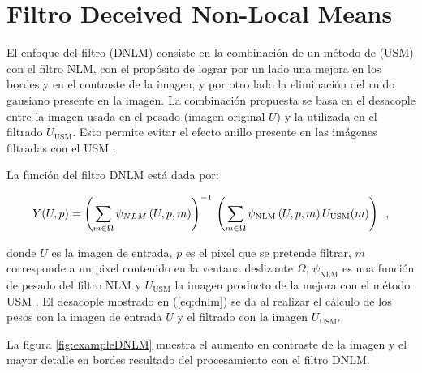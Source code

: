 \section{Filtro Deceived Non-Local Means}
\label{ch:marco_dnlm}


El enfoque del filtro  (DNLM) consiste en la combinación de un método de  (USM) con el filtro NLM, con el propósito de lograr por un lado una mejora en los bordes y en el contraste de la imagen, y por otro lado la eliminación del ruido gausiano  presente en la imagen. La combinación propuesta se basa en el desacople entre la imagen usada en el pesado (imagen original $U$) y la utilizada en el filtrado $U_{\textrm{USM}}$. Esto permite evitar el efecto anillo presente en las im\'agenes filtradas con el USM \cite{calderon2015dewaff}.

La función del filtro DNLM est\'a dada por:

\begin{equation}
\label{eq:dnlm}
Y(U,p)=\left(\sum_{m\in \Omega}\psi_{NLM}\left(U, p, m\right)\right)^{-1} \\ \left(\sum_{m\in \Omega}\psi_{\textrm{NLM}}\left(U, p, m\right)U_{\textrm{USM}}(m)\right) \enspace ,
\end{equation}

donde $U$ es la imagen de entrada, $p$ es el pixel que se pretende filtrar, $m$ corresponde a un pixel contenido en la ventana deslizante $\Omega$, $\psi_{\textrm{NLM}}$ es una función de pesado del filtro NLM y $U_{\textrm{USM}}$ la imagen producto de la mejora con el método USM \cite{calderon2015dewaff}. El desacople mostrado en (\ref{eq:dnlm}) se da al realizar el c\'alculo de los pesos con la imagen de entrada $U$ y el filtrado con la imagen $U_{\textrm{USM}}$.

La figura \ref{fig:exampleDNLM} muestra el aumento en contraste de la imagen y el mayor detalle en bordes resultado del procesamiento con el filtro DNLM.

